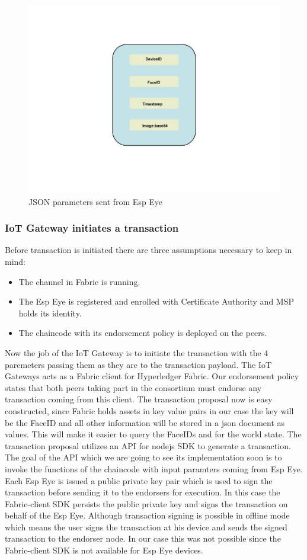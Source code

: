\begin{figure}[!htb]
    \centering
    \includegraphics[width=1\textwidth]{figures/json2.jpg}
    \caption{JSON parameters sent from Esp Eye}
    \label{fig:json}
\end{figure}
\subsubsection{IoT Gateway initiates a transaction}
Before transaction is initiated there are three assumptions necessary to keep in mind:
\begin{itemize}
    \item The channel in Fabric is running.
    \item The Esp Eye is registered and enrolled with Certificate Authority and MSP holds its identity.
    \item The chaincode with its endorsement policy is deployed on the peers.
\end{itemize}


Now the job of the IoT Gateway is to initiate the transaction with the 4 paremeters passing them as they are to the transaction payload. The IoT Gateways acts as a Fabric client for Hyperledger Fabric. Our endorsement policy states that both peers taking part in the consortium must endorse any transaction coming from this client. The transaction proposal now is easy constructed, since Fabric holds assets in key value pairs in our case the key will be the FaceID and all other information will be stored in a json document as values. This will make it easier to query the FaceIDs and for the world state. The transaction proposal utilizes an API for nodejs SDK to generate a transaction. The goal of the API which we are going to see its implementation soon is to invoke the functions of the chaincode with input paramters coming from Esp Eye. Each Esp Eye is issued a public private key pair which is used to sign the transaction before sending it to the endorsers for execution. In this case the Fabric-client SDK persists the public private key and signs the transaction on behalf of the Esp Eye. Although transaction signing is possible in offline mode which means the user signs the transaction at his device and sends the signed transaction to the endorser node. In our case this was not possible since the Fabric-client SDK is not available for Esp Eye devices. 

